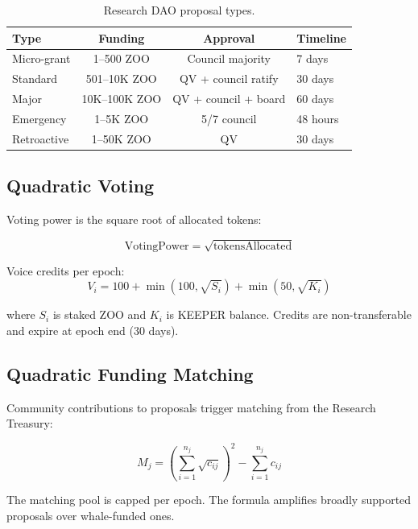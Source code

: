 \documentclass[11pt,letterpaper]{article}
\begin{document}
\begin{table}[h]
\centering
\caption{Research DAO proposal types.}
\label{tab:proposals}
\begin{tabular}{lccl}
\toprule
\textbf{Type} & \textbf{Funding} & \textbf{Approval} & \textbf{Timeline} \\
\midrule
Micro-grant & 1--500 ZOO & Council majority & 7 days \\
Standard & 501--10K ZOO & QV + council ratify & 30 days \\
Major & 10K--100K ZOO & QV + council + board & 60 days \\
Emergency & 1--5K ZOO & 5/7 council & 48 hours \\
Retroactive & 1--50K ZOO & QV & 30 days \\
\bottomrule
\end{tabular}
\end{table}

\subsection{Quadratic Voting}

Voting power is the square root of allocated tokens:

\begin{equation}
    \text{VotingPower} = \sqrt{\text{tokensAllocated}}
\end{equation}

Voice credits per epoch:
\begin{equation}
    V_i = 100 + \min(100, \sqrt{S_i}) + \min(50, \sqrt{K_i})
\end{equation}

where $S_i$ is staked ZOO and $K_i$ is KEEPER balance. Credits are non-transferable and expire at epoch end (30 days).

\subsection{Quadratic Funding Matching}

Community contributions to proposals trigger matching from the Research Treasury:

\begin{equation}
    M_j = \left(\sum_{i=1}^{n_j} \sqrt{c_{ij}}\right)^2 - \sum_{i=1}^{n_j} c_{ij}
\end{equation}

The matching pool is capped per epoch. The formula amplifies broadly supported proposals over whale-funded ones.
\end{document}
